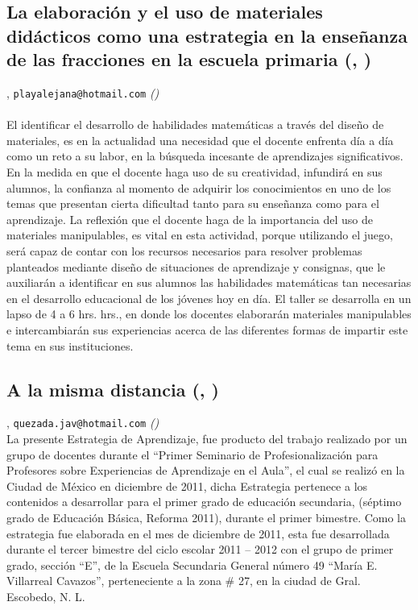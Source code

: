 \subsection{\sffamily La elaboración y el uso de materiales didácticos como una estrategia en la enseñanza de las fracciones en la escuela primaria {\footnotesize (, )}} \label{reg-1887} 
, {\tt playalejana@hotmail.com}  {\slshape ()}\\
\\
\noindent El identificar el desarrollo de habilidades matemáticas a través del diseño de materiales, es en la actualidad una necesidad que el docente enfrenta día a día como un reto a su labor, en la búsqueda incesante de aprendizajes significativos. En la medida en que el docente haga uso de su creatividad, infundirá en sus alumnos,  la confianza al momento de adquirir los conocimientos en uno de los temas que presentan cierta dificultad tanto para su enseñanza como para el aprendizaje. La reflexión que el docente haga de la importancia del uso de materiales manipulables, es vital en esta actividad, porque utilizando el juego, será capaz de contar con los recursos necesarios para resolver problemas planteados mediante diseño de situaciones de aprendizaje y consignas, que le auxiliarán a identificar en sus alumnos las habilidades matemáticas tan necesarias en el desarrollo educacional de los jóvenes hoy en día. El taller se desarrolla en un lapso de 4 a 6 hrs. hrs., en donde los docentes elaborarán materiales manipulables e intercambiarán sus experiencias acerca de las diferentes formas de impartir este tema en sus instituciones.  
\subsection{\sffamily A la misma distancia {\footnotesize (, )}} \label{reg-1882} 
, {\tt quezada.jav@hotmail.com}  {\slshape ()}\\
          \noindent La presente Estrategia de Aprendizaje, fue producto del trabajo realizado por un grupo de docentes durante el “Primer Seminario de Profesionalización para Profesores sobre Experiencias de Aprendizaje en el Aula”, el cual se realizó en la Ciudad de México en diciembre de 2011, dicha Estrategia pertenece a los contenidos a desarrollar para el primer grado de educación secundaria, (séptimo grado de Educación Básica, Reforma 2011), durante el primer bimestre. Como la estrategia fue elaborada en el mes de diciembre de 2011, esta fue desarrollada durante el tercer bimestre del ciclo escolar 2011 – 2012 con el grupo de primer grado, sección “E”, de la Escuela Secundaria General número 49 “María E. Villarreal Cavazos”, perteneciente a la zona # 27, en la ciudad de Gral. Escobedo, N. L.
